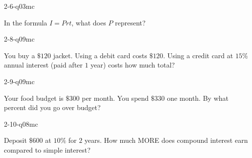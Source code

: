 \begin{practiceQuestion}{2-6-q03}{mc}
\begin{questionText}
In the formula $I = Prt$, what does $P$ represent?
\end{questionText}
\end{practiceQuestion}

\begin{practiceQuestion}{2-8-q09}{mc}
\begin{questionText}
You buy a $\$120$ jacket. Using a debit card costs $\$120$. Using a credit card at $15\%$ annual interest (paid after $1$ year) costs how much total?
\end{questionText}
\end{practiceQuestion}

\begin{practiceQuestion}{2-9-q09}{mc}
\begin{questionText}
Your food budget is $\$300$ per month. You spend $\$330$ one month. By what percent did you go over budget?
\end{questionText}
\end{practiceQuestion}

\begin{practiceQuestion}{2-10-q08}{mc}
\begin{questionText}
Deposit $\$600$ at $10\%$ for $2$ years. How much MORE does compound interest earn compared to simple interest?
\end{questionText}
\end{practiceQuestion}

